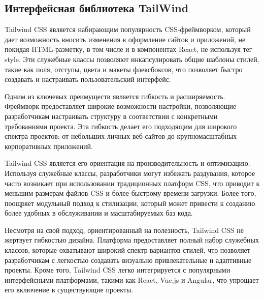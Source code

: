 \documentclass[master, och, pract]{SCWorks}
\begin{document}
\subsection{Интерфейсная библиотека TailWind}
Tailwind CSS является набирающим популярность CSS-фреймворком, который дает возможность вносить изменения в оформление сайтов и приложений, не покидая HTML-разметку, в том числе и в компонентах React, не используя тег style. Эти служебные классы позволяют инкапсулировать общие шаблоны стилей, такие как поля, отступы, цвета и макеты флексбоксов, что позволяет быстро создавать и настраивать пользовательский интерфейс\cite{Tailwind}.

Одним из ключевых преимуществ является гибкость и расширяемость. Фреймворк предоставляет широкие возможности настройки, позволяющие разработчикам настраивать структуру в соответствии с конкретными требованиями проекта. Эта гибкость делает его подходящим для широкого спектра проектов: от небольших личных веб-сайтов до крупномасштабных корпоративных приложений.

Tailwind CSS является его ориентация на производительность и оптимизацию. Используя служебные классы, разработчики могут избежать раздувания, которое часто возникает при использовании традиционных платформ CSS, что приводит к меньшим размерам файлов CSS и более быстрому времени загрузки. Более того, поощряет модульный подход к стилизации, который может привести к созданию более удобных в обслуживании и масштабируемых баз кода.

Несмотря на свой подход, ориентированный на полезность, Tailwind CSS не жертвует гибкостью дизайна. Платформа предоставляет полный набор служебных классов, которые охватывают широкий спектр вариантов стилей, что позволяет разработчикам с легкостью создавать визуально привлекательные и адаптивные проекты. Кроме того, Tailwind CSS легко интегрируется с популярными интерфейсными платформами, такими как React, Vue.js и Angular, что упрощает его включение в существующие проекты\cite{Fain_2022}.
\end{document}
